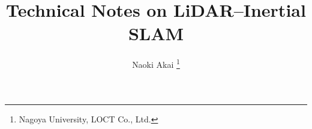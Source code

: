 \documentclass[uplatex,dvipdfmx,a4paper]{book}
\theoremstyle{plain}%
\theoremstyle{definition}
\theoremstyle{remark}
\begin{document}

\title{Technical Notes on LiDAR--Inertial SLAM}
\author{Naoki Akai%
  \thanks{Nagoya University, LOCT Co., Ltd.}
}

\maketitle

% 















\end{document}
